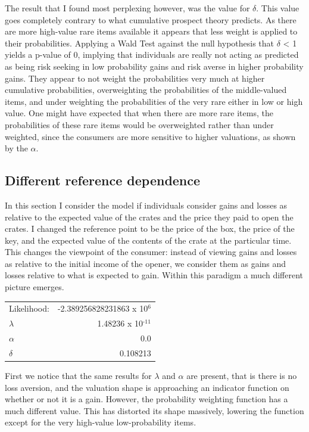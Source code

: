 \documentclass[12pt, letterpaper]{paper}
\begin{document}
The result that I found most perplexing however, was the value for $\delta$.
This value goes completely contrary to what cumulative prospect theory
predicts. As there are more high-value rare items available it
appears that less weight is applied to their probabilities. Applying a
Wald Test against the null hypothesis that $\delta$ < 1 yields a p-value of
0, implying that individuals are really not acting as predicted as
being risk seeking in low probability gains and risk averse in higher
probability gains. They appear to not weight the probabilities very
much at higher cumulative probabilities, overweighting the
probabilities of the middle-valued items, and under weighting the
probabilities of the very rare either in low or high value. One might
have expected that when there are more rare items, the probabilities
of these rare items would be overweighted rather than under weighted,
since the consumers are more sensitive to higher valuations, as shown
by the $\alpha$.

\subsection{Different reference dependence}
\label{sec-5-2}

In this section I consider the model if individuals consider gains and
losses as relative to the expected value of the crates and the price
they paid to open the crates. I changed the reference point to be the
price of the box, the price of the key, and the expected value of the
contents of the crate at the particular time. This changes the
viewpoint of the consumer: instead of viewing gains and losses as
relative to the initial income of the opener, we consider them as
gains and losses relative to what is expected to gain. Within this
paradigm a much different picture emerges.

\begin{center}
\begin{tabular}{lr}
Likelihood: & -2.389256828231863 x 10$^{\text{6}}$\\
$\lambda$ & 1.48236 x 10$^{\text{-11}}$\\
$\alpha$ & 0.0\\
$\delta$ & 0.108213\\
\end{tabular}
\end{center}

First we notice that the same results for $\lambda$ and $\alpha$ are present, that is
there is no loss aversion, and the valuation shape is approaching an
indicator function on whether or not it is a gain. However, the
probability weighting function has a much different value. This has
distorted its shape massively, lowering the function except for the
very high-value low-probability items.
\end{document}

